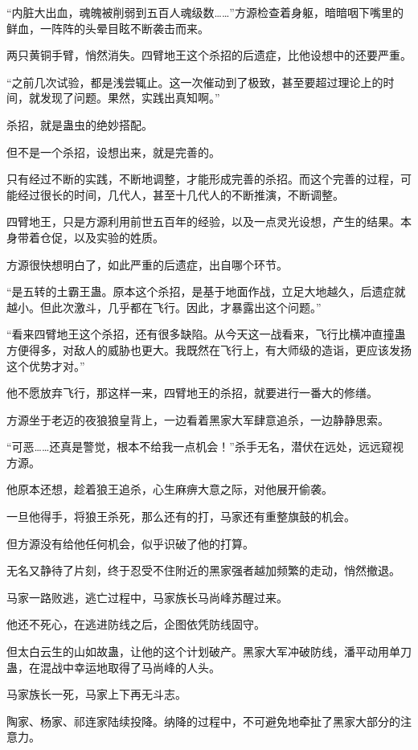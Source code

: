 \begin{this_body}
“内脏大出血，魂魄被削弱到五百人魂级数……”方源检查着身躯，暗暗咽下嘴里的鲜血，一阵阵的头晕目眩不断袭击而来。

两只黄铜手臂，悄然消失。四臂地王这个杀招的后遗症，比他设想中的还要严重。

“之前几次试验，都是浅尝辄止。这一次催动到了极致，甚至要超过理论上的时间，就发现了问题。果然，实践出真知啊。”

杀招，就是蛊虫的绝妙搭配。

但不是一个杀招，设想出来，就是完善的。

只有经过不断的实践，不断地调整，才能形成完善的杀招。而这个完善的过程，可能经过很长的时间，几代人，甚至十几代人的不断推演，不断调整。

四臂地王，只是方源利用前世五百年的经验，以及一点灵光设想，产生的结果。本身带着仓促，以及实验的姓质。

方源很快想明白了，如此严重的后遗症，出自哪个环节。

“是五转的土霸王蛊。原本这个杀招，是基于地面作战，立足大地越久，后遗症就越小。但此次激斗，几乎都在飞行。因此，才暴露出这个问题。”

“看来四臂地王这个杀招，还有很多缺陷。从今天这一战看来，飞行比横冲直撞蛊方便得多，对敌人的威胁也更大。我既然在飞行上，有大师级的造诣，更应该发扬这个优势才对。”

他不愿放弃飞行，那这样一来，四臂地王的杀招，就要进行一番大的修缮。

方源坐于老迈的夜狼狼皇背上，一边看着黑家大军肆意追杀，一边静静思索。

“可恶……还真是警觉，根本不给我一点机会！”杀手无名，潜伏在远处，远远窥视方源。

他原本还想，趁着狼王追杀，心生麻痹大意之际，对他展开偷袭。

一旦他得手，将狼王杀死，那么还有的打，马家还有重整旗鼓的机会。

但方源没有给他任何机会，似乎识破了他的打算。

无名又静待了片刻，终于忍受不住附近的黑家强者越加频繁的走动，悄然撤退。

马家一路败逃，逃亡过程中，马家族长马尚峰苏醒过来。

他还不死心，在逃进防线之后，企图依凭防线固守。

但太白云生的山如故蛊，让他的这个计划破产。黑家大军冲破防线，潘平动用单刀蛊，在混战中幸运地取得了马尚峰的人头。

马家族长一死，马家上下再无斗志。

陶家、杨家、祁连家陆续投降。纳降的过程中，不可避免地牵扯了黑家大部分的注意力。


\end{this_body}
